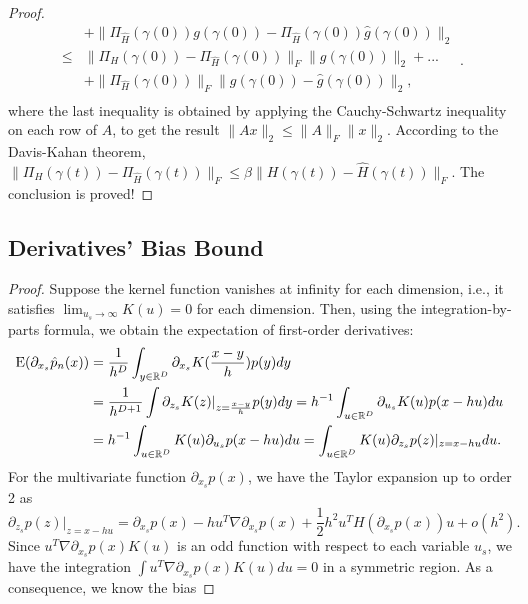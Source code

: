 \documentclass[aos,preprint]{imsart}
\theoremstyle{remark}
\begin{document}
\begin{appendix}
\begin{proof}
\[\begin{aligned}
 & + \|\Pi_{\hat{H}}(\gamma(0)){g}(\gamma(0)) - \Pi_{\hat{H}}(\gamma(0))\hat{g}(\gamma(0))\|_2\\
 \leq & \|\Pi_H(\gamma(0)) - \Pi_{\hat{H}}(\gamma(0))\|_F\|g(\gamma(0))\|_2 +...\\
 &+\|\Pi_{\hat{H}}(\gamma(0))\|_F\|g(\gamma(0))-\hat{g}(\gamma(0))\|_2, \\
 \end{aligned}.
 \]
 where the last inequality is obtained by applying the Cauchy-Schwartz inequality on each row of $A$, to get the result $\|Ax\|_2\leq \|A\|_F\|x\|_2$. According to the Davis-Kahan theorem, $\|\Pi_H(\gamma(t))-\Pi_{\hat{H}}(\gamma(t))\|_F \leq \beta\|H(\gamma(t))-\hat{H}(\gamma(t))\|_F$. The conclusion is proved!
\end{proof}


\subsection{Derivatives' Bias Bound}\label{bias_proof}
\begin{proof}
Suppose the kernel function vanishes at infinity for each dimension, i.e., it satisfies $\lim_{u_s\rightarrow \infty}K(u)=0$ for each dimension. Then, using the integration-by-parts formula, we obtain the expectation of first-order derivatives:
\begin{equation}\label{Expectation}
\begin{aligned}
{\rm E} (\partial_{x_s} \hat{p}_n(x)) &= \frac{1}{h^D} \int_{y\in \mathbb{R}^D}{\partial_{x_s}}  K(\frac{x-y}{h}) p(y) dy  \\
&=\frac{1}{h^{D+1}}\int \partial_{z_s} K(z)|_{z=\frac{x-y}{h}} p(y) dy=h^{-1} \int_ {u\in \mathbb{R}^D} \partial_{u_s} K(u) p(x-hu)  d u\\
&=h^{-1}\int_ {u\in \mathbb{R}^D} K(u) \partial_{u_s} p(x-hu) d u = \int_ {u\in \mathbb{R}^D} K(u) \partial_{z_s}p(z)|_{z=x-hu} d u.
\end{aligned}
\end{equation}
For the multivariate function $\partial_{x_s} p(x)$, we have the Taylor expansion up to order 2 as
\begin{equation}\label{Taylor}
\partial_{z_s} p(z)|_{z=x-hu}= \partial_{x_s} p(x) -  h u^T\nabla \partial_{x_s} p(x) + \frac{1}{2}h^2 u^T H(\partial_{x_s}p(x))u + o(h^2).
\end{equation}
Since $u^T \nabla \partial_{x_s} p(x) K(u)$ is an odd function with respect to each variable $u_s$, we have the integration $\int u^T \nabla \partial_{x_s} p(x) K(u) du = 0 $ in a symmetric region. As a consequence, we know the bias

\end{proof}
\end{appendix}
\end{document}

